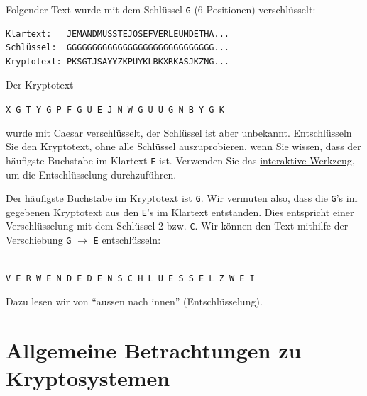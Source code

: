 \begin{myexample}
	Folgender Text wurde mit dem Schlüssel \texttt{G} (6 Positionen) verschlüsselt:

	\begin{verbatim}
Klartext:   JEMANDMUSSTEJOSEFVERLEUMDETHA...
Schlüssel:  GGGGGGGGGGGGGGGGGGGGGGGGGGGGG...
Kryptotext: PKSGTJSAYYZKPUYKLBKXRKASJKZNG...
\end{verbatim}
\end{myexample}

\begin{myexercise}\label{myexercise:vorbetrachung_haeufigkeitsanalyse}
	Der Kryptotext
	\begin{center}
		\texttt{X G T Y G P F G U E J N W G U U G N B Y G K}
	\end{center}
	wurde mit Caesar verschlüsselt, der Schlüssel ist aber unbekannt.
	Entschlüsseln Sie den Kryptotext, ohne alle Schlüssel auszuprobieren, wenn Sie wissen, dass der häufigste Buchstabe im Klartext \texttt{E} ist. Verwenden Sie das \href{https://www.101computing.net/cipher-wheel.html}{interaktive Werkzeug}, um die Entschlüsselung durchzuführen.
	\begin{myanswer}
		Der häufigste Buchstabe im Kryptotext ist \texttt{G}. Wir vermuten also, dass die \texttt{G}'s im gegebenen Kryptotext aus den \texttt{E}'s im Klartext entstanden. Dies entspricht einer Verschlüsselung mit dem Schlüssel 2 bzw. \texttt{C}. Wir können den Text mithilfe der Verschiebung \texttt{G} $\rightarrow$ \texttt{E} entschlüsseln:
		\begin{center}
			\caesar[2]\\
			\texttt{V E R W E N D E D E N S C H L U E S S E L Z W E I}
		\end{center}
		Dazu lesen wir von \enquote{aussen nach innen} (Entschlüsselung).
	\end{myanswer}
\end{myexercise}


\section{Allgemeine Betrachtungen zu Kryptosystemen}
